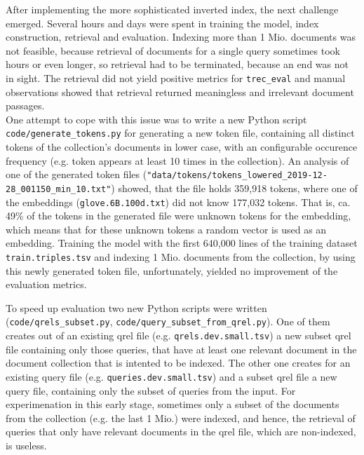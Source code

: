 After implementing the more sophisticated inverted index, the next challenge emerged.
Several hours and days were spent in training the model, index construction, retrieval and evaluation.
Indexing more than 1 Mio. documents was not feasible, because retrieval of documents for a single query sometimes took hours or even longer, so
    retrieval had to be terminated, because an end was not in sight.
The retrieval did not yield positive metrics for \verb|trec_eval| and manual observations showed that retrieval returned meaningless and irrelevant 
    document passages.\\
One attempt to cope with this issue was to write a new Python script \verb|code/generate_tokens.py| for generating a new token file, 
    containing all distinct tokens of the collection's documents in lower case, with an configurable occurence frequency 
    (e.g. token appears at least 10 times in the collection).
An analysis of one of the generated token files (\verb|"data/tokens/tokens_lowered_2019-12-28_001150_min_10.txt"|) showed,
    that the file holds 359,918 tokens, where one of the embeddings (\verb|glove.6B.100d.txt|) did not know 177,032 tokens.
That is, ca. 49\% of the tokens in the generated file were unknown tokens for the embedding,
    which means that for these unknown tokens a random vector is used as an embedding.
Training the model with the first 640,000 lines of the training dataset \verb|train.triples.tsv| and
    indexing 1 Mio. documents from the collection,
    by using this newly generated token file, unfortunately, yielded no improvement of the evaluation
    metrics.

To speed up evaluation two new Python scripts were written
    (\verb|code/qrels_subset.py|, \verb|code/query_subset_from_qrel.py|).
One of them creates out of an existing qrel file (e.g. \verb|qrels.dev.small.tsv|)
    a new subset qrel file containing only those queries, that have at least one 
    relevant document in the document collection that is intented to be indexed.
The other one creates for an existing query file (e.g. \verb|queries.dev.small.tsv|)
    and a subset qrel file a new query file, containing only the subset of queries from the input.
For experimenation in this early stage, sometimes only a subset of the documents from the 
    collection (e.g. the last 1 Mio.) were indexed, and hence, 
    the retrieval of queries that only have relevant documents in the qrel file, which are non-indexed,
    is useless.

